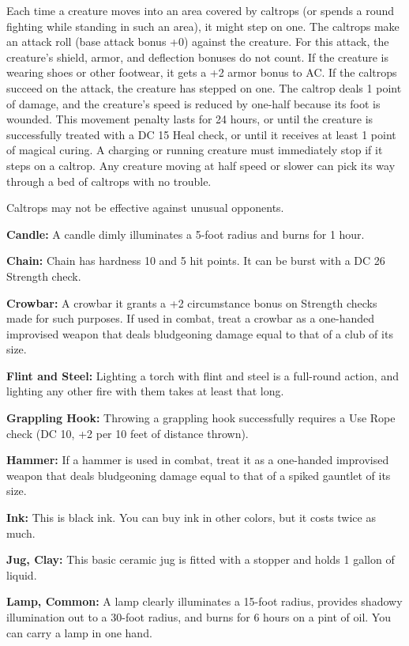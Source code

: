 \documentclass{article}
\begin{document}
Each time a creature moves into an area covered by caltrops (or spends a round 
fighting while standing in such an area), it might step on one. The caltrops make 
an attack roll (base attack bonus +0) against the creature. For this attack, the 
creature's shield, armor, and deflection bonuses do not count. If the creature 
is wearing shoes or other footwear, it gets a +2 armor bonus to AC. If the caltrops 
succeed on the attack, the creature has stepped on one. The caltrop deals 1 point 
of damage, and the creature's speed is reduced by one-half because its foot is 
wounded. This movement penalty lasts for 24 hours, or until the creature is successfully 
treated with a DC 15 Heal check, or until it receives at least 1 point of magical 
curing. A charging or running creature must immediately stop if it steps on a caltrop. 
Any creature moving at half speed or slower can pick its way through a bed of caltrops 
with no trouble.

Caltrops may not be effective against unusual opponents.

\textbf{Candle:} A candle dimly illuminates a 5-foot radius and burns for 1 hour.

\textbf{Chain:} Chain has hardness 10 and 5 hit points. It can be burst with a 
DC 26 Strength check.

\textbf{Crowbar:} A crowbar it grants a +2 circumstance bonus on Strength checks 
made for such purposes. If used in combat, treat a crowbar as a one-handed improvised 
weapon that deals bludgeoning damage equal to that of a club of its size.

\textbf{Flint and Steel:} Lighting a torch with flint and steel is a full-round 
action, and lighting any other fire with them takes at least that long.

\textbf{Grappling Hook:} Throwing a grappling hook successfully requires a Use 
Rope check (DC 10, +2 per 10 feet of distance thrown).

\textbf{Hammer:} If a hammer is used in combat, treat it as a one-handed improvised 
weapon that deals bludgeoning damage equal to that of a spiked gauntlet of its 
size.

\textbf{Ink:} This is black ink. You can buy ink in other colors, but it costs 
twice as much.

\textbf{Jug, Clay:} This basic ceramic jug is fitted with a stopper and holds 1 
gallon of liquid.

\textbf{Lamp, Common:} A lamp clearly illuminates a 15-foot radius, provides shadowy 
illumination out to a 30-foot radius, and burns for 6 hours on a pint of oil. You 
can carry a lamp in one hand. 
\end{document}
